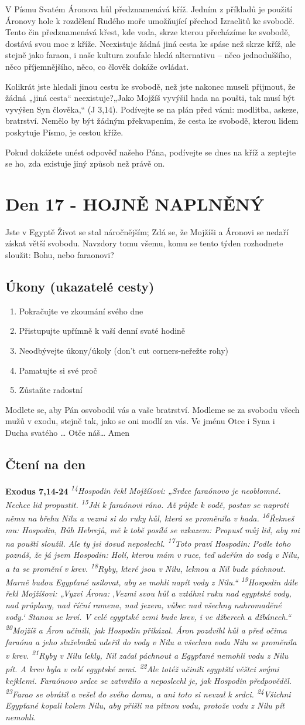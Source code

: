 \documentclass[11pt]{article}
\newcommand{\zacatekTretiTyden}{
  Jste v Egyptě \newline
  Život se stal náročnějším; Zdá se, že Mojžíši a Áronovi se nedaří získat větší svobodu. Navzdory tomu všemu,
komu se tento týden rozhodnete sloužit: Bohu, nebo faraonovi?

\subsection*{Úkony (ukazatelé cesty)}
\begin{enumerate}
  \item Pokračujte ve zkoumání svého dne
  \item Přistupujte upřímně k vaší denní svaté hodině
  \item Neodbývejte úkony/úkoly (don’t cut corners-neřežte rohy)
  \item Pamatujte si své proč
  \item Zůstaňte radostní
\end{enumerate}
Modlete se, aby Pán osvobodil vás a vaše bratrství. \newline
Modleme se za svobodu všech mužů v exodu, stejně tak, jako se oni modlí za vás.\newline
Ve jménu Otce i Syna i Ducha svatého …  Otče náš… Amen
}
\begin{document}
V Písmu Svatém Áronova hůl předznamenává kříž. Jedním z příkladů je použití Áronovy hole k rozdělení
Rudého moře umožňující přechod Izraelitů ke svobodě. Tento čin předznamenává křest, kde voda, skrze
kterou přecházíme ke svobodě, dostává svou moc z kříže. Neexistuje žádná jiná cesta ke spáse než skrze
kříž, ale stejně jako faraon, i naše kultura zoufale hledá alternativu – něco jednoduššího, něco
příjemnějšího, něco, co člověk dokáže ovládat.

Kolikrát jste hledali jinou cestu ke svobodě, než jste nakonec museli přijmout, že žádná „jiná cesta“
neexistuje?„Jako Mojžíš vyvýšil hada na poušti, tak musí být vyvýšen Syn člověka,“ (J 3,14). Podívejte
se na plán před vámi: modlitba, askeze, bratrství. Nemělo by být žádným překvapením, že cesta ke
svobodě, kterou lidem poskytuje Písmo, je cestou kříže.

Pokud dokážete unést odpověď našeho Pána, podívejte se dnes na kříž a zeptejte se ho, zda existuje jiný
způsob než právě on.

\newpage
\section{Den 17 - HOJNĚ NAPLNĚNÝ}
\zacatekTretiTyden
\subsection*{Čtení na den}
\textbf{Exodus 7,14-24}
\newline
\textit{ 
\textsuperscript{14}Hospodin řekl Mojžíšovi: „Srdce faraónovo je neoblomné. Nechce lid propustit.
\textsuperscript{15}Jdi k faraónovi ráno. Až půjde k vodě, postav se naproti němu na břehu Nilu a vezmi si do ruky hůl, která se proměnila v hada.
\textsuperscript{16}Řekneš mu: Hospodin, Bůh Hebrejů, mě k tobě posílá se vzkazem: Propusť můj lid, aby mi na poušti sloužil. Ale ty jsi dosud neposlechl.
\textsuperscript{17}Toto praví Hospodin: Podle toho poznáš, že já jsem Hospodin: Holí, kterou mám v ruce, teď udeřím do vody v Nilu, a ta se promění v krev.
\textsuperscript{18}Ryby, které jsou v Nilu, leknou a Nil bude páchnout. Marně budou Egypťané usilovat, aby se mohli napít vody z Nilu.“
\textsuperscript{19}Hospodin dále řekl Mojžíšovi: „Vyzvi Árona: ‚Vezmi svou hůl a vztáhni ruku nad egyptské vody, nad průplavy, nad říční ramena, nad jezera, vůbec nad všechny nahromaděné vody.‘ Stanou se krví. V celé egyptské zemi bude krev, i ve džberech a džbánech.“
\textsuperscript{20}Mojžíš a Áron učinili, jak Hospodin přikázal. Áron pozdvihl hůl a před očima faraóna a jeho služebníků udeřil do vody v Nilu a všechna voda Nilu se proměnila v krev.
\textsuperscript{21}Ryby v Nilu lekly, Nil začal páchnout a Egypťané nemohli vodu z Nilu pít. A krev byla v celé egyptské zemi.
\textsuperscript{22}Ale totéž učinili egyptští věštci svými kejklemi. Faraónovo srdce se zatvrdilo a neposlechl je, jak Hospodin předpověděl.
\textsuperscript{23}Farao se obrátil a vešel do svého domu, a ani toto si nevzal k srdci.
\textsuperscript{24}Všichni Egypťané kopali kolem Nilu, aby přišli na pitnou vodu, protože vodu z Nilu pít nemohli.
 }
\end{document}
